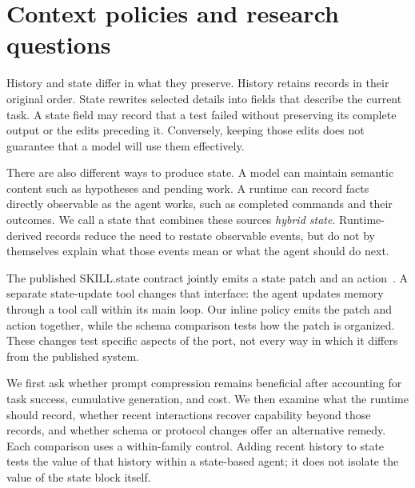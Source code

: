 \section{Context policies and research questions}
\label{sec:background}

History and state differ in what they preserve. History retains
records in their original order. State rewrites selected details into
fields that describe the current task. A state field may
record that a test failed without preserving its complete output or the
edits preceding it. Conversely, keeping those edits does not
guarantee that a model will use them effectively.

There are also different ways to produce state. A model can maintain
semantic content such as hypotheses and pending work. A runtime can record
facts directly observable as the agent works, such as completed commands and
their outcomes. We call a state that combines these sources
\emph{hybrid state}. Runtime-derived records reduce the need to restate
observable events, but do not by themselves explain what those events mean
or what the agent should do next.

The published SKILL.state contract jointly emits a state patch and an
action~\citep{skillstate2026}. A separate state-update tool changes that
interface: the agent updates memory through a tool call within its main
loop. Our inline policy emits the patch and action together,
while the schema comparison tests how the patch is organized. These
changes test specific aspects of the port, not every way in which it
differs from the published system.

We first ask whether prompt compression remains beneficial after accounting
for task success, cumulative generation, and cost. We then examine what
the runtime should record, whether recent interactions recover capability
beyond those records, and whether schema or protocol changes offer an
alternative remedy. Each comparison uses a within-family control.
Adding recent history to state tests the value of that history within a
state-based agent; it does not isolate the value of the state block itself.

